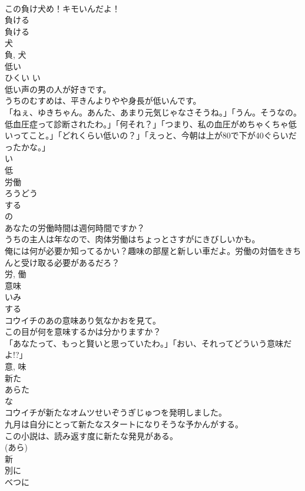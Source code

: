 \documentclass[8pt]{extreport}
\begin{document}
\begin{CJK}{UTF8}{min}
\\	この負け犬め！キモいんだよ！	
\\	負ける 
\\	負ける 
\\	犬 
\\	負, 犬	
\\	低い	
\\	ひくい	い 
\\	低い声の男の人が好きです。	
\\	うちのむすめは、平きんよりやや身長が低いんです。	
\\	「ねぇ、ゆきちゃん。あんた、あまり元気じゃなさそうね。」「うん。そうなの。低血圧症って診断されたわ。」「何それ？」「つまり、私の血圧がめちゃくちゃ低いってこと。」「どれくらい低いの？」「えっと、今朝は上が80で下が40ぐらいだったかな。」	
\\	い 
\\	低	
\\	労働	
\\	ろうどう	
\\	する 
\\	の 
\\	あなたの労働時間は週何時間ですか？	
\\	うちの主人は年なので、肉体労働はちょっとさすがにきびしいかも。	
\\	俺には何が必要か知ってるかい？趣味の部屋と新しい車だよ。労働の対価をきちんと受け取る必要があるだろ？	
\\	労, 働	
\\	意味	
\\	いみ	
\\	する 
\\	コウイチのあの意味あり気なかおを見て。	
\\	この目が何を意味するかは分かりますか？	
\\	「あなたって、もっと賢いと思っていたわ。」「おい、それってどういう意味だよ!?」	
\\	意, 味	
\\	新た	
\\	あらた	
\\	な 
\\	コウイチが新たなオムツせいぞうぎじゅつを発明しました。	
\\	九月は自分にとって新たなスタートになりそうな予かんがする。	
\\	この小説は、読み返す度に新たな発見がある。	
\\	(あら) 
\\	新	
\\	別に	
\\	べつに	

\end{CJK}
\end{document}
